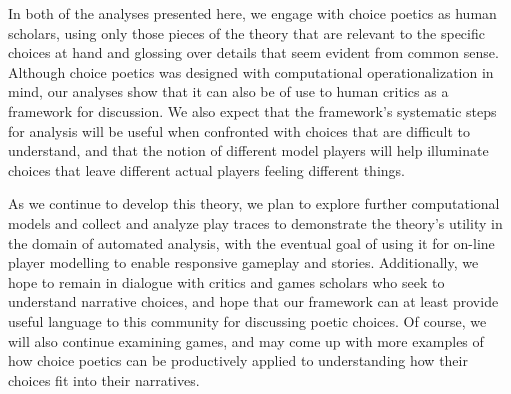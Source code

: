 \documentclass[arts,article,submit,moreauthors,pdftex,10pt,a4paper]{Definitions/mdpi}
\begin{document}
In both of the analyses presented here, we engage with choice poetics as human scholars, using only those pieces of the theory that are relevant to the specific choices at hand and glossing over details that seem evident from common sense.
%
Although choice poetics was designed with computational operationalization in mind, our analyses show that it can also be of use to human critics as a framework for discussion.
%
We also expect that the framework's systematic steps for analysis will be useful when confronted with choices that are difficult to understand, and that the notion of different model players will help illuminate choices that leave different actual players feeling different things.


As we continue to develop this theory, we plan to explore further computational models and collect and analyze play traces to demonstrate the theory's utility in the domain of automated analysis, with the eventual goal of using it for on-line player modelling to enable responsive gameplay and stories.
%
Additionally, we hope to remain in dialogue with critics and games scholars who seek to understand narrative choices, and hope that our framework can at least provide useful language to this community for discussing poetic choices.
%
Of course, we will also continue examining games, and may come up with more examples of how choice poetics can be productively applied to understanding how their choices fit into their narratives.

\vspace{6pt} 






\end{document}
